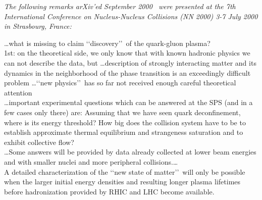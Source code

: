\noindent \textit{The following remarks arXiv\rq ed September 2000~\cite{Heinz:2000ba} were presented at the 7th International Conference on Nucleus-Nucleus Collisions (NN 2000) 3-7 July 2000 in Strasbourg, France:}\\[-0.7cm]
\begin{mdframed}[linecolor=gray,roundcorner=12pt,backgroundcolor=GreenYellow!15,linewidth=1pt,leftmargin=0cm,rightmargin=0cm,topline=true,bottomline=true,skipabove=12pt]\relax%
%
\label{Heinz2000} \ldots what is missing to claim \lq\lq discovery\rq\rq\ of the quark-gluon plasma? \\
1st: on the theoretical side, we only know that with known hadronic physics we can not describe the data, but \ldots description of strongly interacting matter and its dynamics in the neighborhood
of the phase transition is an exceedingly difficult problem \ldots \lq\lq new physics\rq\rq\ has so far not received enough careful theoretical attention \\
\ldots important experimental questions which can be answered at the SPS (and in a few cases only there) are: Assuming that we have seen quark deconfinement, where is its energy threshold? How big does the collision system have to be to establish approximate thermal equilibrium and strangeness saturation and to exhibit collective flow? \\
\ldots Some answers will be provided by data already collected at lower beam energies and with smaller nuclei and more peripheral collisions.\ldots\\
 A detailed characterization of the \lq\lq new state of matter\rq\rq\ will only be possible when the larger initial energy densities and resulting longer plasma lifetimes before hadronization provided by RHIC and LHC become available. 
%
\end{mdframed}
\vskip 0.5cm

